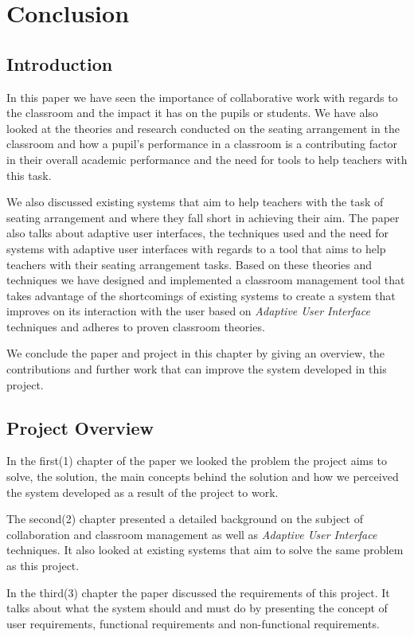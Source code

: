 \section{Conclusion}
\subsection{Introduction}
 In this paper we have seen the importance of collaborative work with regards to the classroom and the impact it has on the pupils or students. We have also looked at the theories and research conducted on the seating arrangement in the classroom and how a pupil's performance in a classroom is a contributing factor in their overall academic performance and the need for tools to help teachers with this task.

We also discussed existing systems that aim to help teachers with the task of seating arrangement and where they fall short in achieving their aim. The paper also talks about adaptive user interfaces, the techniques used and the need for systems with adaptive user interfaces with regards to a tool that aims to help teachers with their seating arrangement tasks. Based on these theories and techniques we have designed and implemented a classroom management tool that takes advantage of the shortcomings of existing systems to create a system that improves on its interaction with the user based on \emph{Adaptive User Interface} techniques and adheres to proven classroom theories.

We conclude the paper and project in this chapter by giving an overview, the contributions and further work that can improve the system developed in this project.
\subsection{Project Overview}
 In the first(1) chapter of the paper we looked the problem the project aims to solve, the solution, the main concepts behind the solution and how we perceived the system developed as a result of the project to work.
 
 The second(2) chapter presented a detailed background on the subject of collaboration and classroom management as well as \emph{Adaptive User Interface} techniques. It also looked at existing systems that aim to solve the same problem as this project.
 
 In the third(3) chapter the paper discussed the requirements of this project. It talks about what the system should and must do by presenting the concept of user requirements, functional requirements and non-functional requirements.
 
